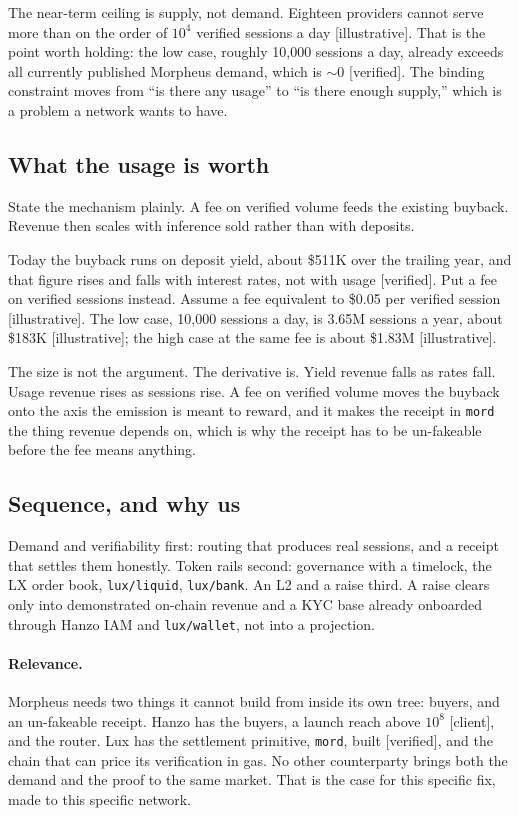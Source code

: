 \documentclass[11pt,a4paper]{article}
\newcommand{\code}[1]{\texttt{\small #1}}
\begin{document}
\noindent
The near-term ceiling is supply, not demand. Eighteen providers cannot serve more
than on the order of $10^4$ verified sessions a day [illustrative]. That is the
point worth holding: the low case, roughly 10{,}000 sessions a day, already
exceeds all currently published Morpheus demand, which is $\sim$0 [verified]. The
binding constraint moves from ``is there any usage'' to ``is there enough
supply,'' which is a problem a network wants to have.

\subsection{What the usage is worth}

State the mechanism plainly. A fee on verified volume feeds the existing buyback.
Revenue then scales with inference sold rather than with deposits.

Today the buyback runs on deposit yield, about \$511K over the trailing year,
and that figure rises and falls with interest rates, not with usage [verified].
Put a fee on verified sessions instead. Assume a fee equivalent to \$0.05 per
verified session [illustrative]. The low case, 10{,}000 sessions a day, is 3.65M
sessions a year, about \$183K [illustrative]; the high case at the same fee is
about \$1.83M [illustrative].

The size is not the argument. The derivative is. Yield revenue falls as rates
fall. Usage revenue rises as sessions rise. A fee on verified volume moves the
buyback onto the axis the emission is meant to reward, and it makes the receipt
in \code{mord} the thing revenue depends on, which is why the receipt has to be
un-fakeable before the fee means anything.

\subsection{Sequence, and why us}

Demand and verifiability first: routing that produces real sessions, and a
receipt that settles them honestly. Token rails second: governance with a
timelock, the LX order book, \code{lux/liquid}, \code{lux/bank}. An L2 and a
raise third. A raise clears only into demonstrated on-chain revenue and a KYC
base already onboarded through Hanzo IAM and \code{lux/wallet}, not into a
projection.

\paragraph{Relevance.} Morpheus needs two things it cannot build from inside its
own tree: buyers, and an un-fakeable receipt. Hanzo has the buyers, a launch
reach above $10^8$ [client], and the router. Lux has the settlement primitive,
\code{mord}, built [verified], and the chain that can price its verification in
gas. No other counterparty brings both the demand and the proof to the same
market. That is the case for this specific fix, made to this specific network.
\end{document}
